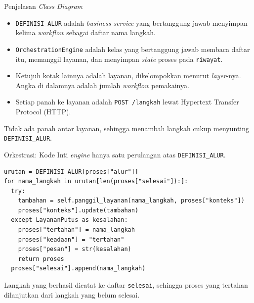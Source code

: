 \documentclass[aspectratio=169, table, 12pt]{beamer}
\begin{document}
\begin{frame}{{\Large Penjelasan \textit{Class Diagram}}}
  \vspace{8pt}
  \begin{itemize}\small
    \item \texttt{DEFINISI\_ALUR} adalah \textit{business service} yang
          bertanggung jawab menyimpan kelima \textit{workflow} sebagai daftar
          nama langkah.
    \item \texttt{OrchestrationEngine} adalah kelas yang bertanggung jawab
          membaca daftar itu, memanggil layanan, dan menyimpan \textit{state}
          proses pada \texttt{riwayat}.
    \item Ketujuh kotak lainnya adalah layanan, dikelompokkan menurut
          \textit{layer}-nya. Angka di dalamnya adalah jumlah \textit{workflow}
          pemakainya.
    \item Setiap panah ke layanan adalah \texttt{POST /langkah} lewat
          Hypertext Transfer Protocol (HTTP).
  \end{itemize}

  \vspace{4pt}
  {\small Tidak ada panah antar layanan, sehingga menambah langkah cukup
  menyunting \texttt{DEFINISI\_ALUR}.}
\end{frame}

\begin{frame}[fragile]{{\Large Orkestrasi: Kode}}
  \vspace{14pt}
  {\small Inti \textit{engine} hanya satu perulangan atas
  \texttt{DEFINISI\_ALUR}.}
  \vspace{2pt}
\begin{lstlisting}[style=PythonStyle, emph={DEFINISI_ALUR, panggil_layanan},
  emphstyle={\color{praditagreen}\bfseries}]
urutan = DEFINISI_ALUR[proses["alur"]]
for nama_langkah in urutan[len(proses["selesai"]):]:
  try:
    tambahan = self.panggil_layanan(nama_langkah, proses["konteks"])
    proses["konteks"].update(tambahan)
  except LayananPutus as kesalahan:
    proses["tertahan"] = nama_langkah
    proses["keadaan"] = "tertahan"
    proses["pesan"] = str(kesalahan)
    return proses
  proses["selesai"].append(nama_langkah)
\end{lstlisting}
  \vspace{2pt}
  {\small Langkah yang berhasil dicatat ke daftar \texttt{selesai}, sehingga
  proses yang tertahan dilanjutkan dari langkah yang belum selesai.}
\end{frame}
\end{document}
